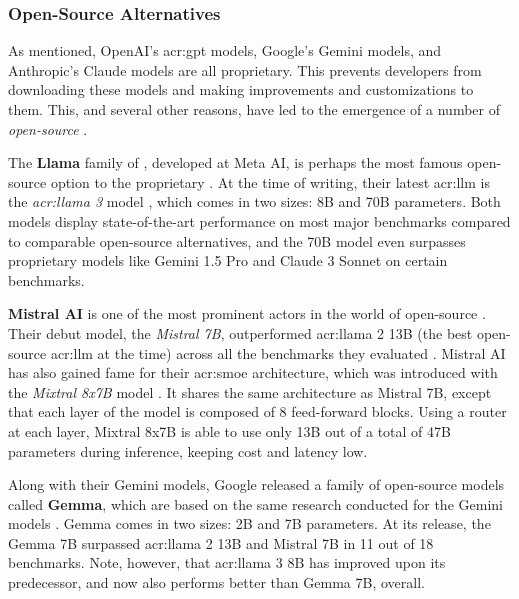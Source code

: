 \subsubsection{Open-Source Alternatives}
\label{subsubsec:open-source-llms}

As mentioned, OpenAI's \acrshort{acr:gpt} models, Google's Gemini models, and Anthropic's Claude models are all proprietary. This prevents developers from downloading these models and making improvements and customizations to them. This, and several other reasons, have led to the emergence of a number of \textit{open-source} .

The \textbf{Llama} family of , developed at Meta AI, is perhaps the most famous open-source option to the proprietary . At the time of writing, their latest \acrshort{acr:llm} is the \textit{\acrshort{acr:llama} 3} model \citep{metaaiIntroducingMetaLlama2024}, which comes in two sizes: 8B and 70B parameters. Both models display state-of-the-art performance on most major benchmarks compared to comparable open-source alternatives, and the 70B model even surpasses proprietary models like Gemini 1.5 Pro and Claude 3 Sonnet on certain benchmarks.

\textbf{Mistral AI} is one of the most prominent actors in the world of open-source . Their debut model, the \textit{Mistral 7B}, outperformed \acrshort{acr:llama} 2 13B (the best open-source \acrshort{acr:llm} at the time) across all the benchmarks they evaluated \citep{jiangMistral7B2023}. Mistral AI has also gained fame for their \gls{acr:smoe} architecture, which was introduced with the \textit{Mixtral 8x7B} model \citep{jiangMixtralExperts2024}. It shares the same architecture as Mistral 7B, except that each layer of the model is composed of 8 feed-forward blocks. Using a router at each layer, Mixtral 8x7B is able to use only 13B out of a total of 47B parameters during inference, keeping cost and latency low.

Along with their Gemini models, Google released a family of open-source models called \textbf{Gemma}, which are based on the same research conducted for the Gemini models \citep{gemmateamGemmaOpenModels2024}. Gemma comes in two sizes: 2B and 7B parameters. At its release, the Gemma 7B surpassed \acrshort{acr:llama} 2 13B and Mistral 7B in 11 out of 18 benchmarks. Note, however, that \acrshort{acr:llama} 3 8B has improved upon its predecessor, and now also performs better than Gemma 7B, overall.


